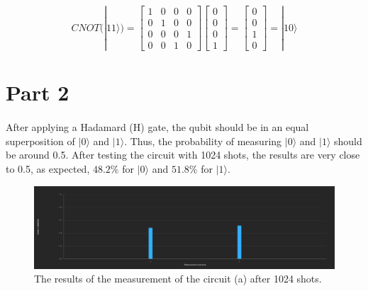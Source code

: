 \documentclass[12pt]{article}
\begin{document}
$$ CNOT(|11⟩) = \begin{bmatrix} 1 & 0 & 0 & 0 \\ 0 & 1 & 0 & 0 \\ 0 & 0 & 0 & 1 \\ 0 & 0 & 1 & 0 \end{bmatrix} \begin{bmatrix} 0 \\ 0 \\ 0 \\ 1 \end{bmatrix} = \begin{bmatrix} 0 \\ 0 \\ 1 \\ 0 \end{bmatrix} = |10⟩ $$

\newpage

\section*{Part 2}

\paragraph*{}

After applying a Hadamard (H) gate, the qubit should be in an equal superposition of $|0⟩$ and $|1⟩$. Thus, the probability of measuring $|0⟩$ and $|1⟩$ should be around 0.5. After testing the circuit with 1024 shots, the results are very close to 0.5, as expected, $48.2\%$ for $|0⟩$ and $51.8\%$ for $|1⟩$.

\begin{figure}[H]
    \centering
    \includegraphics[scale=0.27]{a.png}
    \caption{The results of the measurement of the circuit (a) after 1024 shots.}
\end{figure}

\paragraph*{}
\end{document}
